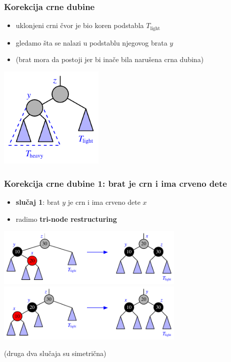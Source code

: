 \documentclass[compress,aspectratio=169]{beamer}
\begin{document}
\begin{frame}[fragile]
  \frametitle{Korekcija crne dubine}
  \begin{itemize}
    \item uklonjeni crni čvor je bio koren podstabla $T_{\text{light}}$
    \item gledamo šta se nalazi u podstablu njegovog brata $y$ 
    \item (brat mora da postoji jer bi inače bila narušena crna dubina)
  \end{itemize}
  \begin{center}
    \includegraphics[width=5cm]{asp-11-pic41.pdf}
  \end{center}
\end{frame}

\begin{frame}[fragile]
  \frametitle{Korekcija crne dubine 1: brat je crn i ima crveno dete}
  \begin{itemize}
    \item \textbf{slučaj 1}: brat $y$ je crn i ima crveno dete $x$
    \item radimo \textbf{tri-node restructuring}
  \end{itemize}
  \begin{center}
    \includegraphics[width=9cm]{asp-11-pic42a.pdf} \\
    \includegraphics[width=9cm]{asp-11-pic42b.pdf} \\
  \end{center}
  {\scriptsize (druga dva slučaja su simetrična)}
\end{frame}
\end{document}
